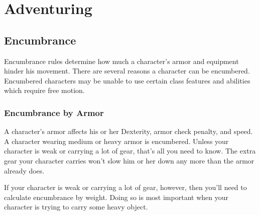 \chapter{Adventuring}

\section{Encumbrance}\label{Encumbrance}
Encumbrance rules determine how much a character's armor and equipment hinder his movement. There are several reasons a character can be encumbered. Encumbered characters may be unable to use certain class features and abilities which require free motion.

\subsection{Encumbrance by Armor}

A character's armor affects his or her Dexterity, armor check penalty, and speed. A character wearing medium or heavy armor is encumbered. Unless your character is weak or carrying a lot of gear, that's all you need to know. The extra gear your character carries won't slow him or her down any more than the armor already does.

If your character is weak or carrying a lot of gear, however, then you'll need to calculate encumbrance by weight. Doing so is most important when your character is trying to carry some heavy object.

